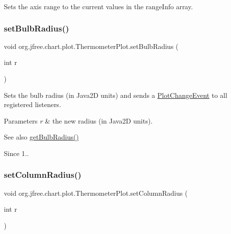 Sets the axis range to the current values in the range\+Info array. \mbox{\label{classorg_1_1jfree_1_1chart_1_1plot_1_1_thermometer_plot_a8b0b038ef390e5609be37290c3307c72}} 
\subsubsection{\texorpdfstring{set\+Bulb\+Radius()}{setBulbRadius()}}
{\footnotesize\ttfamily void org.\+jfree.\+chart.\+plot.\+Thermometer\+Plot.\+set\+Bulb\+Radius (\begin{DoxyParamCaption}\item[{int}]{r }\end{DoxyParamCaption})}

Sets the bulb radius (in Java2D units) and sends a \mbox{\hyperlink{}{Plot\+Change\+Event}} to all registered listeners.


\begin{DoxyParams}{Parameters}
{\em r} & the new radius (in Java2D units).\\
\hline
\end{DoxyParams}
\begin{DoxySeeAlso}{See also}
\mbox{\hyperlink{classorg_1_1jfree_1_1chart_1_1plot_1_1_thermometer_plot_a37a2c1afb3ae05c507d06c96ca60741e}{get\+Bulb\+Radius()}}
\end{DoxySeeAlso}
\begin{DoxySince}{Since}
1.. 
\end{DoxySince}
\mbox{\label{classorg_1_1jfree_1_1chart_1_1plot_1_1_thermometer_plot_abdca1e8b671c03e4cfa948b622a93b29}} 
\subsubsection{\texorpdfstring{set\+Column\+Radius()}{setColumnRadius()}}
{\footnotesize\ttfamily void org.\+jfree.\+chart.\+plot.\+Thermometer\+Plot.\+set\+Column\+Radius (\begin{DoxyParamCaption}\item[{int}]{r }\end{DoxyParamCaption})}

